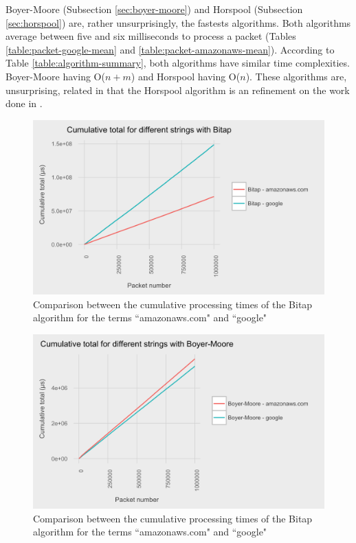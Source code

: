 \documentclass{article}
\begin{document}
Boyer-Moore \citep{Boyer1977} (Subsection \ref{sec:boyer-moore}) and Horspool \citep{Horspool1980} (Subsection \ref{sec:horspool}) are, rather unsurprisingly, the fastests algorithms. Both algorithms average between five and six milliseconds to process a packet (Tables \ref{table:packet-google-mean} and \ref{table:packet-amazonaws-mean}). According to Table \ref{table:algorithm-summary}, both algorithms have similar time complexities. Boyer-Moore having O(\(n+m\)) and Horspool having O(\(n\)). These algorithms are, unsurprising, related in that the Horspool algorithm is an refinement on the work done in \cite{Boyer1977}.



\begin{figure}[h!bt]
  \centering
  \includegraphics[width=\textwidth]{graphs/term_length_compare-bitap.png}
  \caption{Comparison between the cumulative processing times of the Bitap algorithm for the terms ``amazonaws.com" and ``google"}
\end{figure}

\begin{figure}[h!bt]
  \centering
  \includegraphics[width=\textwidth]{graphs/term_length_compare-boyer-moore.png}
  \caption{Comparison between the cumulative processing times of the Bitap algorithm for the terms ``amazonaws.com" and ``google"}
\end{figure}
\end{document}

